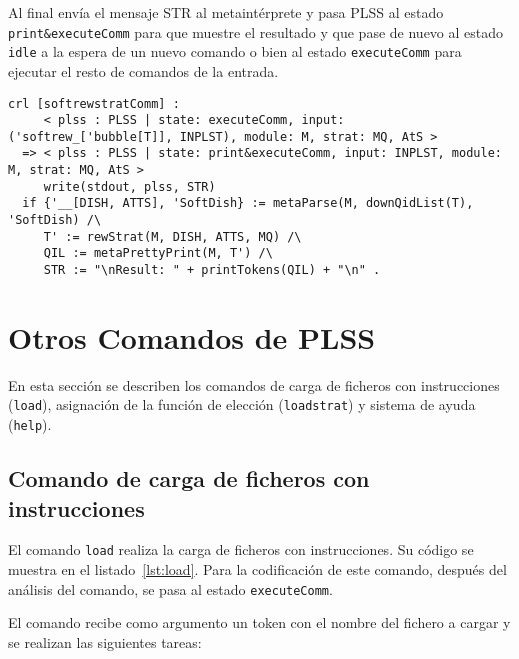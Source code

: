 Al final envía el mensaje STR al metaintérprete y pasa PLSS al estado \texttt{print\&executeComm} para que muestre el resultado y que pase de nuevo al estado \texttt{idle} a la espera de un nuevo comando o bien al estado \texttt{executeComm} para ejecutar el resto de comandos de la entrada.
\medskip


\begin{lstlisting}[language=Maude,label={lst:softrew},caption={Comando \texttt{softrew} en PLSS.}]
 crl [softrewstratComm] :
     < plss : PLSS | state: executeComm, input: ('softrew_['bubble[T]], INPLST), module: M, strat: MQ, AtS >
  => < plss : PLSS | state: print&executeComm, input: INPLST, module: M, strat: MQ, AtS >
     write(stdout, plss, STR)
  if {'__[DISH, ATTS], 'SoftDish} := metaParse(M, downQidList(T), 'SoftDish) /\
     T' := rewStrat(M, DISH, ATTS, MQ) /\
     QIL := metaPrettyPrint(M, T') /\
     STR := "\nResult: " + printTokens(QIL) + "\n" .
\end{lstlisting}




\section{Otros Comandos de PLSS}

En esta sección se describen los comandos de carga de ficheros con instrucciones (\texttt{load}), asignación de la función de elección (\texttt{loadstrat}) y sistema de ayuda (\texttt{help}).


\subsection{Comando de carga de ficheros con instrucciones}

El comando \texttt{load} realiza la carga de ficheros con instrucciones.
Su código se muestra en el listado~\ref{lst:load}.
%
Para la codificación de este comando, después del análisis del comando, se pasa al estado \texttt{executeComm}.
\smallskip

El comando recibe como argumento un token con el nombre del fichero a cargar y se realizan las siguientes tareas:

